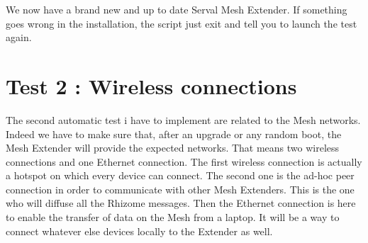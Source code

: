 We now have a brand new and up to date Serval Mesh Extender. If something goes wrong in the installation, the script just exit and tell you to launch the test again. 

\section{Test 2 : Wireless connections}

The second automatic test i have to implement are related to the Mesh networks. Indeed we have to make sure that, after an upgrade or any random boot, the Mesh Extender will provide the expected networks. That means two wireless connections and one Ethernet connection. The first wireless connection is actually a hotspot on which every device can connect. The second one is the ad-hoc peer connection in order to communicate with other Mesh Extenders. This is the one who will diffuse all the Rhizome messages. Then the Ethernet connection is here to enable the transfer of data on the Mesh from a laptop. It will be a way to connect whatever else devices locally to the Extender as well. \\


